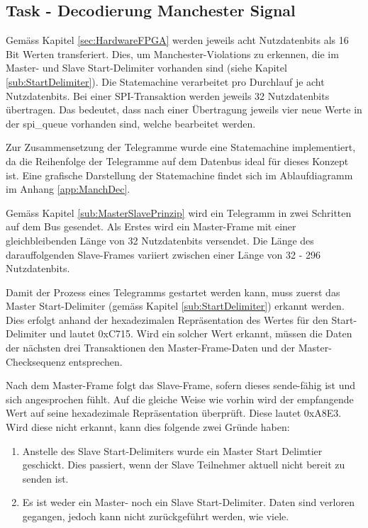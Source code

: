 \subsection{Task - Decodierung Manchester Signal}
\label{sub:MvbManchDecode}
Gemäss Kapitel \ref{sec:HardwareFPGA} werden jeweils acht Nutzdatenbits als 16 Bit Werten transferiert. Dies, um Manchester-Violations zu erkennen, die im Master- und Slave Start-Delimiter vorhanden sind (siehe Kapitel \ref{sub:StartDelimiter}). Die Statemachine verarbeitet pro Durchlauf je acht Nutzdatenbits. Bei einer SPI-Transaktion werden jeweils 32 Nutzdatenbits übertragen. Das bedeutet, dass nach einer Übertragung jeweils vier neue Werte in der spi\_queue vorhanden sind, welche bearbeitet werden. 

Zur Zusammensetzung der Telegramme wurde eine Statemachine implementiert, da die Reihenfolge der Telegramme auf dem Datenbus ideal für dieses Konzept ist. Eine grafische Darstellung der Statemachine findet sich im Ablaufdiagramm im Anhang \ref{app:ManchDec}.

Gemäss Kapitel \ref{sub:MasterSlavePrinzip} wird ein Telegramm in zwei Schritten auf dem Bus gesendet. Als Erstes wird ein Master-Frame mit einer gleichbleibenden Länge von 32 Nutzdatenbits versendet. Die Länge des darauffolgenden Slave-Frames variiert zwischen einer Länge von 32 - 296 Nutzdatenbits.

Damit der Prozess eines Telegramms gestartet werden kann, muss zuerst das Master Start-Delimiter (gemäss Kapitel \ref{sub:StartDelimiter}) erkannt werden. Dies erfolgt anhand der hexadezimalen Repräsentation des Wertes für den Start-Delimiter und lautet 0xC715. Wird ein solcher Wert erkannt, müssen die Daten der nächsten drei Transaktionen den Master-Frame-Daten und der Master-Checksequenz entsprechen.

Nach dem Master-Frame folgt das Slave-Frame, sofern dieses sende-fähig ist und sich angesprochen fühlt. Auf die gleiche Weise wie vorhin wird der empfangende Wert auf seine hexadezimale Repräsentation überprüft. Diese lautet 0xA8E3. Wird diese nicht erkannt, kann dies folgende zwei Gründe haben:

\begin{enumerate}
    \item Anstelle des Slave Start-Delimiters wurde ein Master Start Delimtier geschickt. Dies passiert, wenn der Slave Teilnehmer aktuell nicht bereit zu senden ist. 
    \item Es ist weder ein Master- noch ein Slave Start-Delimiter. Daten sind verloren gegangen, jedoch kann nicht zurückgeführt werden, wie viele.
\end{enumerate}

